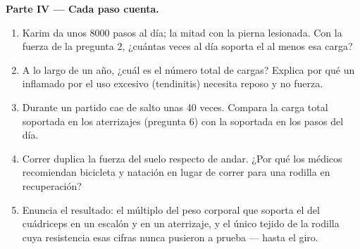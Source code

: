 \begin{problem}
\medskip
\noindent\textbf{Parte IV --- Cada paso cuenta.}
\begin{enumerate}[resume]
  \item Karim da unos 8000 pasos al día; la mitad con la pierna
        lesionada. Con la fuerza de la pregunta 2, ¿cuántas veces al
        día soporta el  al menos esa carga?
  \item A lo largo de un año, ¿cuál es el número total de cargas?
        Explica por qué un  inflamado por el uso excesivo
        (tendinitis) necesita reposo y no fuerza.
  \item Durante un partido cae de salto unas 40 veces. Compara la carga
        total soportada en los aterrizajes (pregunta 6) con la
        soportada en los pasos del día.
  \item Correr duplica la fuerza del suelo respecto de andar. ¿Por qué
        los médicos recomiendan bicicleta y natación en lugar de correr
        para una rodilla en recuperación?
  \item Enuncia el resultado: el múltiplo del peso corporal que soporta
        el  del cuádriceps en un escalón y en un aterrizaje, y el
        único tejido de la rodilla cuya resistencia esas cifras nunca
        pusieron a prueba --- hasta el giro.
\end{enumerate}
\end{problem}
